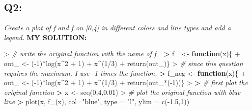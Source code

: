 \documentclass[
]{article}
\newenvironment{Shaded}{\begin{snugshade}}{\end{snugshade}}
\newcommand{\AttributeTok}[1]{\textcolor[rgb]{0.77,0.63,0.00}{#1}}
\newcommand{\CommentTok}[1]{\textcolor[rgb]{0.56,0.35,0.01}{\textit{#1}}}
\newcommand{\ControlFlowTok}[1]{\textcolor[rgb]{0.13,0.29,0.53}{\textbf{#1}}}
\newcommand{\DecValTok}[1]{\textcolor[rgb]{0.00,0.00,0.81}{#1}}
\newcommand{\ErrorTok}[1]{\textcolor[rgb]{0.64,0.00,0.00}{\textbf{#1}}}
\newcommand{\FloatTok}[1]{\textcolor[rgb]{0.00,0.00,0.81}{#1}}
\newcommand{\FunctionTok}[1]{\textcolor[rgb]{0.00,0.00,0.00}{#1}}
\newcommand{\NormalTok}[1]{#1}
\newcommand{\OtherTok}[1]{\textcolor[rgb]{0.56,0.35,0.01}{#1}}
\newcommand{\SpecialCharTok}[1]{\textcolor[rgb]{0.00,0.00,0.00}{#1}}
\newcommand{\StringTok}[1]{\textcolor[rgb]{0.31,0.60,0.02}{#1}}
\begin{document}
\hypertarget{q2}{%
\subsection{Q2:}\label{q2}}

\emph{Create a plot of f and f on {[}0,4{]} in different colors and line
types and add a legend.} \textbf{MY SOLUTION:}

\begin{Shaded}
\begin{Highlighting}[]
\SpecialCharTok{\textgreater{}} \CommentTok{\# write the original function with the name of f\_}
\ErrorTok{\textgreater{}}\NormalTok{ f\_ }\OtherTok{\textless{}{-}} \ControlFlowTok{function}\NormalTok{(x)\{}
\SpecialCharTok{+}\NormalTok{   out\_ }\OtherTok{\textless{}{-}}\NormalTok{ (}\SpecialCharTok{{-}}\DecValTok{1}\NormalTok{)}\SpecialCharTok{*}\FunctionTok{log}\NormalTok{(x}\SpecialCharTok{\^{}}\DecValTok{2} \SpecialCharTok{+} \DecValTok{1}\NormalTok{) }\SpecialCharTok{+}\NormalTok{ x}\SpecialCharTok{\^{}}\NormalTok{(}\DecValTok{1}\SpecialCharTok{/}\DecValTok{3}\NormalTok{)}
\SpecialCharTok{+}   \FunctionTok{return}\NormalTok{(out\_)\}}
\SpecialCharTok{\textgreater{}} \CommentTok{\# since this question requires the maximum, I use {-}1 times the function.}
\ErrorTok{\textgreater{}}\NormalTok{ f\_neg }\OtherTok{\textless{}{-}} \ControlFlowTok{function}\NormalTok{(x)\{}
\SpecialCharTok{+}\NormalTok{   out\_ }\OtherTok{\textless{}{-}}\NormalTok{ (}\SpecialCharTok{{-}}\DecValTok{1}\NormalTok{)}\SpecialCharTok{*}\FunctionTok{log}\NormalTok{(x}\SpecialCharTok{\^{}}\DecValTok{2} \SpecialCharTok{+} \DecValTok{1}\NormalTok{) }\SpecialCharTok{+}\NormalTok{ x}\SpecialCharTok{\^{}}\NormalTok{(}\DecValTok{1}\SpecialCharTok{/}\DecValTok{3}\NormalTok{)}
\SpecialCharTok{+}   \FunctionTok{return}\NormalTok{(out\_}\SpecialCharTok{*}\NormalTok{(}\SpecialCharTok{{-}}\DecValTok{1}\NormalTok{))\}}
\SpecialCharTok{\textgreater{}} 
\ErrorTok{\textgreater{}} \CommentTok{\# first plot the original function}
\ErrorTok{\textgreater{}}\NormalTok{ x }\OtherTok{\textless{}{-}} \FunctionTok{seq}\NormalTok{(}\DecValTok{0}\NormalTok{,}\DecValTok{4}\NormalTok{,}\FloatTok{0.01}\NormalTok{)}
\SpecialCharTok{\textgreater{}} \CommentTok{\# plot the original function with blue line}
\ErrorTok{\textgreater{}} \FunctionTok{plot}\NormalTok{(x, }\FunctionTok{f\_}\NormalTok{(x), }\AttributeTok{col=}\StringTok{"blue"}\NormalTok{, }\AttributeTok{type =} \StringTok{"l"}\NormalTok{, }\AttributeTok{ylim =} \FunctionTok{c}\NormalTok{(}\SpecialCharTok{{-}}\FloatTok{1.5}\NormalTok{,}\DecValTok{1}\NormalTok{))}

\end{Highlighting}
\end{Shaded}
\end{document}
